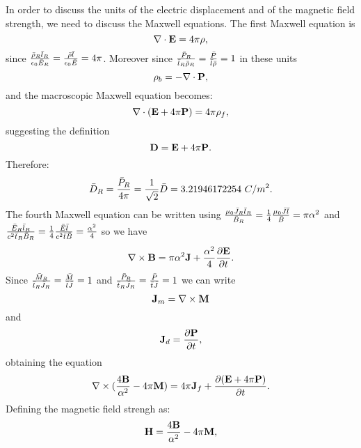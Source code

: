 \documentclass[12pt,a4paper]{article}
\def\bardry{3.21946172254}
\begin{document}
{In order to discuss the units of the electric displacement and of
the magnetic field strength, we need to discuss the Maxwell equations.
The first Maxwell equation is
\begin{equation}
\nabla\cdot {\bf E} = 4 \pi \rho,
\end{equation}
since ${\bar \rho_R \bar l_R \over \epsilon_0 \bar E_R}=
{\bar \rho \bar l \over \epsilon_0 \bar E}=4\pi$. Moreover since
${\bar P_R \over \bar l_R \bar \rho_R}={\bar P \over \bar l \bar \rho}=1$
in these units 
\begin{equation}
\rho_b=-\nabla \cdot {\bf P},
\end{equation} 
and the macroscopic Maxwell equation becomes:
\begin{equation}
\nabla\cdot ({\bf E}+4\pi {\bf P}) = 4 \pi \rho_f,
\end{equation}
suggesting the definition
\begin{equation}
{\bf D}={\bf E}+4\pi {\bf P}.
\end{equation}
Therefore:
\begin{equation}
\bar D_R={\bar P_R \over 4 \pi} = {1\over \sqrt{2}} \bar D=\bardry\ C/m^2.
\end{equation}
The fourth Maxwell equation can be written using
${\mu_0 \bar J_R \bar l_R \over \bar B_R}={1\over 4} 
{\mu_0 \bar J \bar l \over \bar B}= \pi \alpha^2$ and
${\bar E_R \bar l_R \over c^2 \bar t_R \bar B_R}={1\over 4}
{\bar E \bar l \over c^2 \bar t \bar B}={\alpha^2 \over 4}$ so we have
\begin{equation}
\nabla \times {\bf B}= \pi \alpha^2 {\bf J} + {\alpha^2 \over 4}
{\partial {\bf E} \over \partial t}.
\end{equation}
Since ${\bar M_R \over \bar l_R \bar J_R}={\bar M \over \bar l \bar J}=1$
and ${\bar P_R \over \bar t_R \bar J_R}={\bar P \over \bar t \bar J}=1$
we can write
\begin{equation}
{\bf J}_m=\nabla \times {\bf M}
\end{equation}
and
\begin{equation}
{\bf J}_d={\partial {\bf P} \over \partial t},
\end{equation}
obtaining the equation
\begin{equation}
\nabla \times ({4{\bf B} \over \alpha^2}-4 \pi {\bf M})= 4 \pi 
{\bf J}_f + {\partial ({\bf E}+4\pi {\bf P}) \over \partial t}.
\end{equation}
Defining the magnetic field strengh as:
\begin{equation}
{\bf H}={4{\bf B} \over \alpha^2}-4 \pi {\bf M},

\end{equation}}
\end{document}
